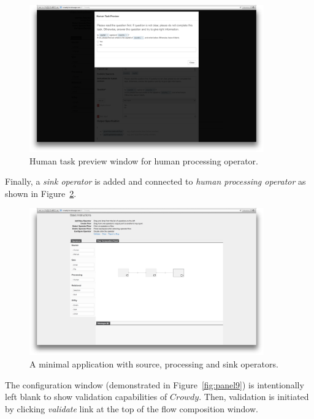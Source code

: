 \begin{figure}[ht]
	\centering
	\includegraphics[width=0.9\textwidth]{figures/tool/panel7.png}
	\caption{Human task preview window for human processing operator.}
	\label{fig:panel7}
\end{figure}

Finally, a \textit{sink operator} is added and connected to 
\textit{human processing operator} as shown in Figure~\ref{fig:panel8}.

\begin{figure}[ht]
	\centering
	\includegraphics[width=0.9\textwidth]{figures/tool/panel8.png}
	\caption{A minimal application with source, processing and sink operators.}
	\label{fig:panel8}
\end{figure}

The configuration window (demonstrated in Figure~\ref{fig:panel9}) is intentionally 
left blank to show validation capabilities of $Crowdy$. Then, validation is 
initiated by clicking \textit{validate} link at the top of the flow composition window.

